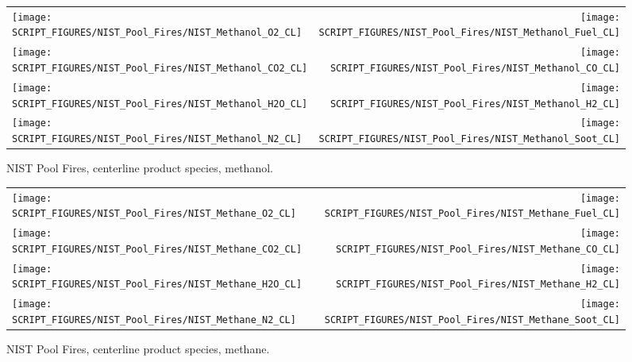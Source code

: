 \begin{figure}[p]
\begin{tabular*}{\textwidth}{l@{\extracolsep{\fill}}r}
\texttt{[image: SCRIPT\_FIGURES/NIST\_Pool\_Fires/NIST\_Methanol\_O2\_CL]} &
\texttt{[image: SCRIPT\_FIGURES/NIST\_Pool\_Fires/NIST\_Methanol\_Fuel\_CL]} \\
\texttt{[image: SCRIPT\_FIGURES/NIST\_Pool\_Fires/NIST\_Methanol\_CO2\_CL]} &
\texttt{[image: SCRIPT\_FIGURES/NIST\_Pool\_Fires/NIST\_Methanol\_CO\_CL]}    \\
\texttt{[image: SCRIPT\_FIGURES/NIST\_Pool\_Fires/NIST\_Methanol\_H2O\_CL]} &
\texttt{[image: SCRIPT\_FIGURES/NIST\_Pool\_Fires/NIST\_Methanol\_H2\_CL]} \\
\texttt{[image: SCRIPT\_FIGURES/NIST\_Pool\_Fires/NIST\_Methanol\_N2\_CL]} &
\texttt{[image: SCRIPT\_FIGURES/NIST\_Pool\_Fires/NIST\_Methanol\_Soot\_CL]}
\end{tabular*}
\caption[NIST Pool Fires, centerline product species, methanol]{NIST Pool Fires, centerline product species, methanol.}
\label{NIST_Pool_Fires_Methanol}
\end{figure}

\begin{figure}[p]
\begin{tabular*}{\textwidth}{l@{\extracolsep{\fill}}r}
\texttt{[image: SCRIPT\_FIGURES/NIST\_Pool\_Fires/NIST\_Methane\_O2\_CL]} &
\texttt{[image: SCRIPT\_FIGURES/NIST\_Pool\_Fires/NIST\_Methane\_Fuel\_CL]} \\
\texttt{[image: SCRIPT\_FIGURES/NIST\_Pool\_Fires/NIST\_Methane\_CO2\_CL]} &
\texttt{[image: SCRIPT\_FIGURES/NIST\_Pool\_Fires/NIST\_Methane\_CO\_CL]}    \\
\texttt{[image: SCRIPT\_FIGURES/NIST\_Pool\_Fires/NIST\_Methane\_H2O\_CL]} &
\texttt{[image: SCRIPT\_FIGURES/NIST\_Pool\_Fires/NIST\_Methane\_H2\_CL]} \\
\texttt{[image: SCRIPT\_FIGURES/NIST\_Pool\_Fires/NIST\_Methane\_N2\_CL]} &
\texttt{[image: SCRIPT\_FIGURES/NIST\_Pool\_Fires/NIST\_Methane\_Soot\_CL]}
\end{tabular*}
\caption[NIST Pool Fires, centerline product species, methane]{NIST Pool Fires, centerline product species, methane.}
\label{NIST_Pool_Fires_Methane}
\end{figure}

